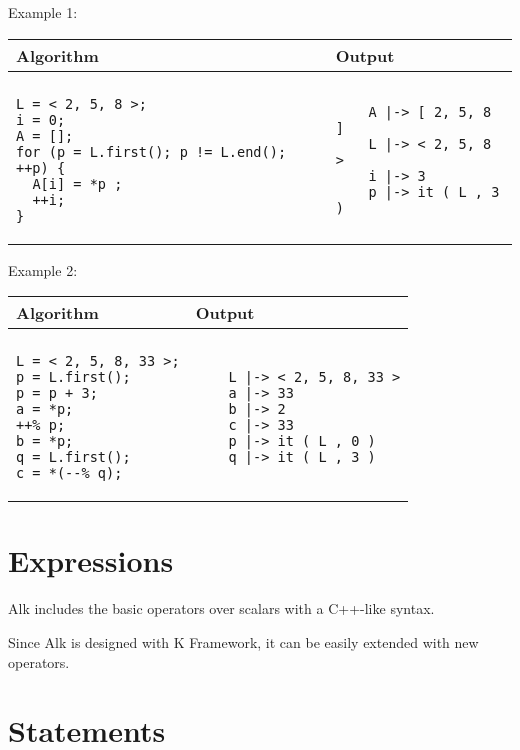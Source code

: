 \documentclass[a4paper]{report}
\begin{document}
Example 1:
\begin{center}
\begin{tabular}{ll}
Algorithm & Output\\
\hline
\\
\begin{minipage}{.45\textwidth}
\begin{verbatim}
L = < 2, 5, 8 >;
i = 0;
A = [];
for (p = L.first(); p != L.end(); ++p) {
  A[i] = *p ;
  ++i;
}
\end{verbatim}
\end{minipage}
&
\begin{minipage}{.45\textwidth}
\begin{verbatim}
    A |-> [ 2, 5, 8 ]
    L |-> < 2, 5, 8 >
    i |-> 3
    p |-> it ( L , 3 )
\end{verbatim}
\end{minipage}
\end{tabular}
\end{center}

Example 2:
\begin{center}
\begin{tabular}{ll}
Algorithm & Output\\
\hline
\\
\begin{minipage}{.45\textwidth}
\begin{verbatim}
L = < 2, 5, 8, 33 >;
p = L.first();
p = p + 3;
a = *p;
++% p;
b = *p;
q = L.first();
c = *(--% q);
\end{verbatim}
\end{minipage}
&
\begin{minipage}{.45\textwidth}
\begin{verbatim}
    L |-> < 2, 5, 8, 33 >
    a |-> 33
    b |-> 2
    c |-> 33
    p |-> it ( L , 0 )
    q |-> it ( L , 3 )
\end{verbatim}
\end{minipage}
\end{tabular}
\end{center}

\section{Expressions}

Alk includes the basic operators over scalars with a C++-like syntax.

Since Alk is designed with K Framework, it can be easily extended with new operators. 

\section{Statements}
\end{document}
